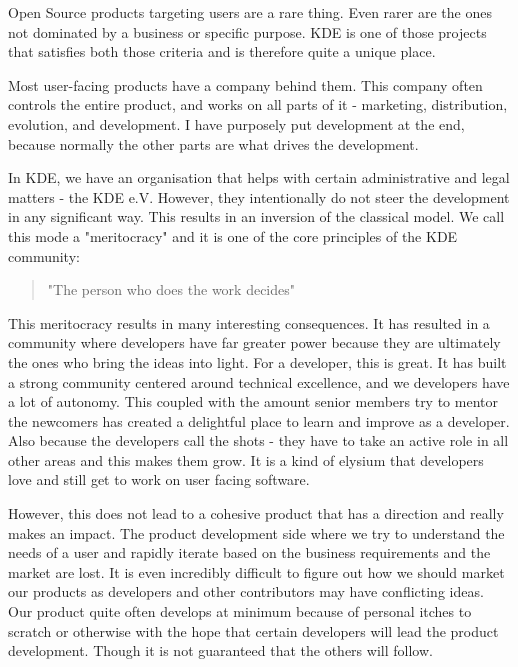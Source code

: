 


\noindent{}Open Source products targeting users are a rare thing. Even rarer are the ones not dominated by a business or specific purpose. KDE is one of those projects that satisfies both those criteria and is therefore quite a unique place.

Most user-facing products have a company behind them. This company often controls the entire product, and works on all parts of it - marketing, distribution, evolution, and development. I have purposely put development at the end, because normally the other parts are what drives the development.

In KDE, we have an organisation that helps with certain administrative and legal matters - the KDE e.V. However, they intentionally do not steer the development in any significant way. This results in an inversion of the classical model. We call this mode a "meritocracy" and it is one of the core principles of the KDE community:

\begin{quote}"The person who does the work decides"\end{quote}

This meritocracy results in many interesting consequences. It has resulted in a community where developers have far greater power because they are ultimately the ones who bring the ideas into light. For a developer, this is great. It has built a strong community centered around technical excellence, and we developers have a lot of autonomy. This coupled with the amount senior members try to mentor the newcomers has created a delightful place to learn and improve as a developer. Also because the developers call the shots - they have to take an active role in all other areas and this makes them grow. It is a kind of elysium that developers love and still get to work on user facing software.

However, this does not lead to a cohesive product that has a direction and really makes an impact. The product development side where we try to understand the needs of a user and rapidly iterate based on the business requirements and the market are lost. It is even incredibly difficult to figure out how we should market our products as developers and other contributors may have conflicting ideas. Our product quite often develops at minimum because of personal itches to scratch or otherwise with the hope that certain developers will lead the product development. Though it is not guaranteed that the others will follow.

